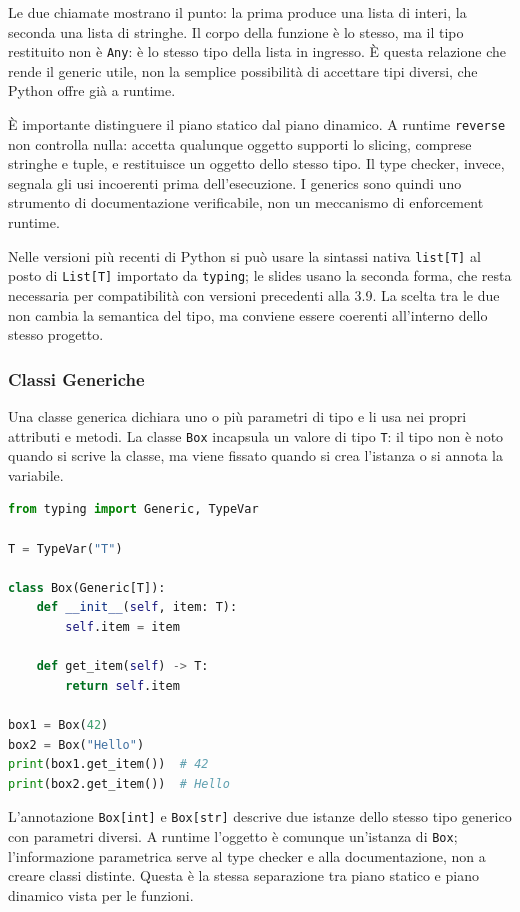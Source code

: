 \documentclass[12pt]{extarticle}
\begin{document}
\noindent Le due chiamate mostrano il punto: la prima produce una lista di interi, la seconda una lista di stringhe. Il corpo della funzione è lo stesso, ma il tipo restituito non è \texttt{Any}: è lo stesso tipo della lista in ingresso. È questa relazione che rende il generic utile, non la semplice possibilità di accettare tipi diversi, che Python offre già a runtime.

\noindent È importante distinguere il piano statico dal piano dinamico. A runtime \texttt{reverse} non controlla nulla: accetta qualunque oggetto supporti lo slicing, comprese stringhe e tuple, e restituisce un oggetto dello stesso tipo. Il type checker, invece, segnala gli usi incoerenti prima dell'esecuzione. I generics sono quindi uno strumento di documentazione verificabile, non un meccanismo di enforcement runtime.

\noindent Nelle versioni più recenti di Python si può usare la sintassi nativa \texttt{list[T]} al posto di \texttt{List[T]} importato da \texttt{typing}; le slides usano la seconda forma, che resta necessaria per compatibilità con versioni precedenti alla 3.9. La scelta tra le due non cambia la semantica del tipo, ma conviene essere coerenti all'interno dello stesso progetto.

\subsubsection{Classi Generiche}

\noindent Una classe generica dichiara uno o più parametri di tipo e li usa nei propri attributi e metodi. La classe \texttt{Box} incapsula un valore di tipo \texttt{T}: il tipo non è noto quando si scrive la classe, ma viene fissato quando si crea l'istanza o si annota la variabile.

\begin{lstlisting}[language=Python]
from typing import Generic, TypeVar

T = TypeVar("T")

class Box(Generic[T]):
    def __init__(self, item: T):
        self.item = item

    def get_item(self) -> T:
        return self.item

box1 = Box(42)
box2 = Box("Hello")
print(box1.get_item())  # 42
print(box2.get_item())  # Hello
\end{lstlisting}

\noindent L'annotazione \texttt{Box[int]} e \texttt{Box[str]} descrive due istanze dello stesso tipo generico con parametri diversi. A runtime l'oggetto è comunque un'istanza di \texttt{Box}; l'informazione parametrica serve al type checker e alla documentazione, non a creare classi distinte. Questa è la stessa separazione tra piano statico e piano dinamico vista per le funzioni.
\end{document}
